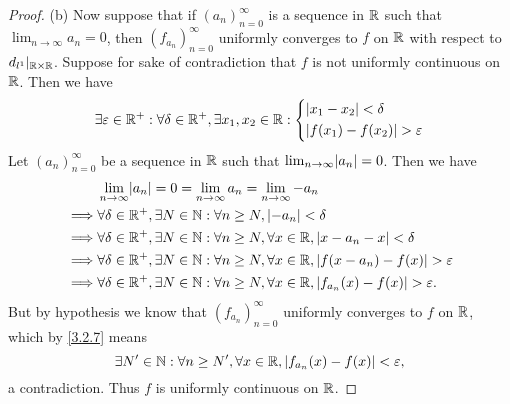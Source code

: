 \begin{proof}{(b)}
  Now suppose that if \((a_n)_{n = 0}^\infty\) is a sequence in \(\mathbb{R}\) such that \(\lim_{n \to \infty} a_n = 0\), then \((f_{a_n})_{n = 0}^\infty\) uniformly converges to \(f\) on \(\mathbb{R}\) with respect to \(d_{l^1}|_{\mathbb{R} \times \mathbb{R}}\).
  Suppose for sake of contradiction that \(f\) is not uniformly continuous on \(\mathbb{R}\).
  Then we have
  \[
    \exists \varepsilon \in \mathbb{R}^+ : \forall \delta \in \mathbb{R}^+, \exists x_1, x_2 \in \mathbb{R} : \begin{dcases}
      \left\lvert x_1 - x_2\right\rvert < \delta \\
      \left\lvert f(x_1) - f(x_2)\right\rvert > \varepsilon
    \end{dcases}
  \]
  Let \((a_n)_{n = 0}^\infty\) be a sequence in \(\mathbb{R}\) such that \(\lim_{n \to \infty} \abs{a_n} = 0\).
  Then we have
  \begin{align*}
             & \lim_{n \to \infty} \abs{a_n} = 0 = \lim_{n \to \infty} a_n = \lim_{n \to \infty} -a_n                                 \\
    \implies & \forall \delta \in \R^+, \exists N \in \N : \forall n \geq N, \abs{-a_n} < \delta                                      \\
    \implies & \forall \delta \in \R^+, \exists N \in \N : \forall n \geq N, \forall x \in \R, \abs{x - a_n - x} < \delta             \\
    \implies & \forall \delta \in \R^+, \exists N \in \N : \forall n \geq N, \forall x \in \R, \abs{f(x - a_n) - f(x)} > \varepsilon  \\
    \implies & \forall \delta \in \R^+, \exists N \in \N : \forall n \geq N, \forall x \in \R, \abs{f_{a_n}(x) - f(x)} > \varepsilon.
  \end{align*}
  But by hypothesis we know that \((f_{a_n})_{n = 0}^\infty\) uniformly converges to \(f\) on \(\mathbb{R}\), which by \cref{3.2.7} means
  \[
    \exists N' \in \mathbb{N} : \forall n \geq N', \forall x \in \mathbb{R}, \left\lvert f_{a_n}(x) - f(x)\right\rvert < \varepsilon,
  \]
  a contradiction.
  Thus \(f\) is uniformly continuous on \(\mathbb{R}\).
\end{proof}

